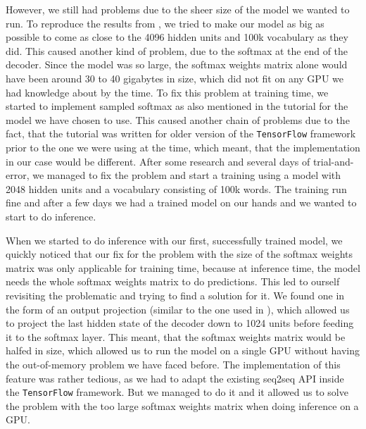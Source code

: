 However, we still had problems due to the sheer size of the model we wanted to run. To reproduce the results from \cite{Vinyals:2015}, we tried to make our model as big as possible to come as close to the 4096 hidden units and 100k vocabulary as they did. This caused another kind of problem, due to the softmax at the end of the decoder. Since the model was so large, the softmax weights matrix alone would have been around 30 to 40 gigabytes in size, which did not fit on any GPU we had knowledge about by the time. To fix this problem at training time, we started to implement sampled softmax as also mentioned in the tutorial for the model we have chosen to use. This caused another chain of problems due to the fact, that the tutorial was written for older version of the \texttt{TensorFlow} framework prior to the one we were using at the time, which meant, that the implementation in our case would be different. After some research and several days of trial-and-error, we managed to fix the problem and start a training using a model with 2048 hidden units and a vocabulary consisting of 100k words. The training run fine and after a few days we had a trained model on our hands and we wanted to start to do inference.

When we started to do inference with our first, successfully trained model, we quickly noticed that our fix for the problem with the size of the softmax weights matrix was only applicable for training time, because at inference time, the model needs the whole softmax weights matrix to do predictions. This led to ourself revisiting the problematic and trying to find a solution for it. We found one in the form of an output projection (similar to the one used in \cite{Vinyals:2015}), which allowed us to project the last hidden state of the decoder down to 1024 units before feeding it to the softmax layer. This meant, that the softmax weights matrix would be halfed in size, which allowed us to run the model on a single GPU without having the out-of-memory problem we have faced before. The implementation of this feature was rather tedious, as we had to adapt the existing seq2seq API inside the \texttt{TensorFlow} framework. But we managed to do it and it allowed us to solve the problem with the too large softmax weights matrix when doing inference on a GPU.

